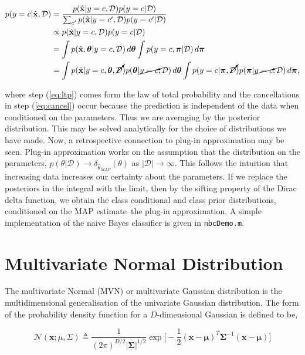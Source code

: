 \documentclass[11pt]{amsart}
\begin{document}
\begin{align}
p(y = c|\hat{\mathbf{x}}, \mathcal{D}) &= \frac{p(\hat{\mathbf{x}}|y = c, \mathcal{D})p(y=c|\mathcal{D})}{\sum_{c'}p(\hat{\mathbf{x}}|y = c', \mathcal{D})p(y=c'|\mathcal{D})} \notag \\ &\propto p(\hat{\mathbf{x}}|y = c, \mathcal{D})p(y=c|\mathcal{D}) \notag \\
&= \int p(\hat{\mathbf{x}}, \boldsymbol\theta|y = c, \mathcal{D})\mathop{d\boldsymbol\theta}\int p(y=c, \boldsymbol\pi|\mathcal{D})\mathop{d\boldsymbol\pi} \label{eq:ltp} \\
&= \int p(\hat{\mathbf{x}}|y = c, \boldsymbol\theta, \cancelto{}{\mathcal{D}})p(\boldsymbol\theta|\cancelto{}{y = c}, \mathcal{D})\mathop{d\boldsymbol\theta}\int p(y=c|\boldsymbol\pi, \cancelto{}{\mathcal{D}})p(\boldsymbol\pi|\cancelto{}{y = c}, \mathcal{D})\mathop{d\boldsymbol\pi}, \label{eq:cancel}
\end{align}

where step (\ref{eq:ltp}) comes form the law of total probability and the cancellations in step (\ref{eq:cancel}) occur because the prediction is independent of the data when conditioned on the parameters. Thus we are averaging by the posterior distribution. This may be solved analytically for the choice of distributions we have made. Now, a retrospective connection to plug-in approximation may be seen. Plug-in approximation works on the assumption that the distribution on the parameters, $p(\theta|\mathcal{D}) \to \delta_{\hat{\theta}_{MAP}}(\theta)$ as $|\mathcal{D}| \to \infty$. This follows the intuition that increasing data increases our certainty about the parameters. If we replace the posteriors in the integral with the limit, then by the sifting property of the Dirac delta function, we obtain the class conditional and class prior distributions, conditioned on the MAP estimate--the plug-in approximation. A simple implementation of the naive Bayes classifier is given in \texttt{nbcDemo.m}. 

\section{Multivariate Normal Distribution}
The multivariate Normal (MVN) or multivariate Gaussian distribution is the multidimensional generalisation of the univariate Gaussian distribution. The form of the probability density function for a $D$-dimensional Gaussian is defined to be,

$$\mathcal{N}(\mathbf{x} ; \mu, \Sigma) \triangleq \frac{1}{(2\pi)^{D/2}|\boldsymbol\Sigma|^{1/2}}
\exp\bigg[-\frac{1}{2}(\mathbf{x} - \boldsymbol\mu)^T\boldsymbol\Sigma^{-1}(\mathbf{x} - \boldsymbol\mu)\bigg]
$$
\end{document}

